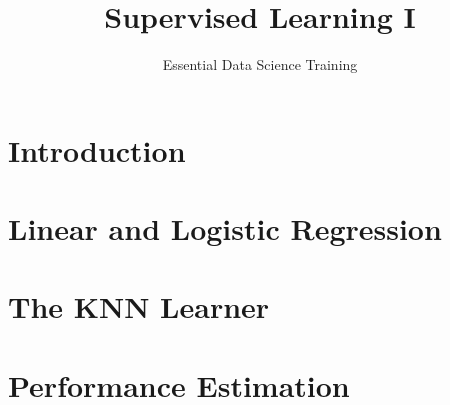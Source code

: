 \documentclass[13pt,compress]{beamer}
\title{Supervised Learning I}
\author{Essential Data Science Training}
\date{}
\begin{document}


\frame{\titlepage}

\section{Introduction}







\section{Linear and Logistic Regression}





\section{The KNN Learner}

\section{Performance Estimation}




\end{document}
